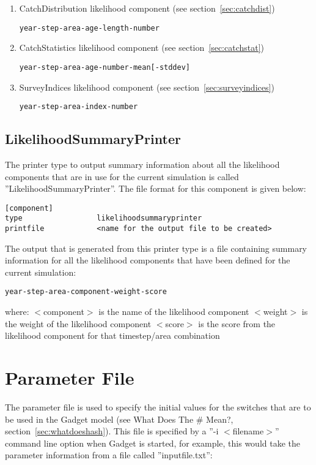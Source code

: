 \documentclass[10pt,twoside]{book}
\begin{document}
\begin{enumerate}
\item CatchDistribution likelihood component (see section~\ref{sec:catchdist})
{\small\begin{verbatim}
year-step-area-age-length-number
\end{verbatim}}
\item CatchStatistics likelihood component (see section~\ref{sec:catchstat})
{\small\begin{verbatim}
year-step-area-age-number-mean[-stddev]
\end{verbatim}}
\item SurveyIndices likelihood component (see section~\ref{sec:surveyindices})
{\small\begin{verbatim}
year-step-area-index-number
\end{verbatim}}
\end{enumerate}

\section{LikelihoodSummaryPrinter}\label{sec:likelihoodsummaryprinter}
The printer type to output summary information about all the likelihood components that are in use for the current simulation is called ''LikelihoodSummaryPrinter''.  The file format for this component is given below:

{\small\begin{verbatim}
[component]
type                 likelihoodsummaryprinter
printfile            <name for the output file to be created>
\end{verbatim}}

The output that is generated from this printer type is a file containing summary information for all the likelihood components that have been defined for the current simulation:

{\small\begin{verbatim}
year-step-area-component-weight-score
\end{verbatim}}

where:\newline
$<$component$>$ is the name of the likelihood component\newline
$<$weight$>$ is the weight of the likelihood component\newline
$<$score$>$ is the score from the likelihood component for that timestep/area combination

\chapter{Parameter File}\label{chap:param}
The parameter file is used to specify the initial values for the switches that are to be used in the Gadget model (see What Does The \# Mean?, section~\ref{sec:whatdoeshash}).  This file is specified by a ''-i $<$filename$>$'' command line option when Gadget is started, for example, this would take the parameter information from a file called ''inputfile.txt'':
\end{document}
